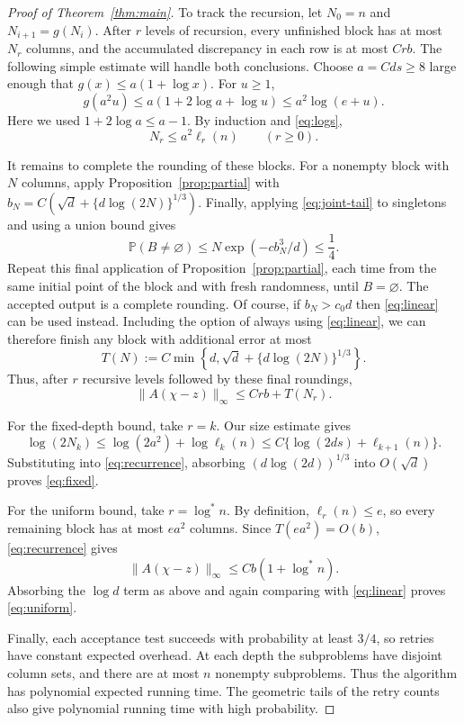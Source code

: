 \documentclass[10pt,a4paper]{amsart}
\newcommand{\Prob}{\mathbb P}
\newcommand{\norm}[1]{\lVert#1\rVert}
\newcommand{\lstar}{\log^*}
\begin{document}
\begin{proof}[Proof of Theorem~\ref{thm:main}]
To track the recursion, let $N_0=n$ and $N_{i+1}=g(N_i)$. After $r$ levels of recursion, every unfinished block has at most $N_r$ columns, and the accumulated discrepancy in each row is at most $Crb$. The following simple estimate will handle both conclusions. Choose $a=Cds\ge8$ large enough that $g(x)\le a(1+\log x)$. For $u\ge1$,
\[ g(a^2u) \le a(1+2\log a+\log u) \le a^2\log(e+u). \]
Here we used $1+2\log a\le a-1$. By induction and \eqref{eq:logs},
\[ N_r\le a^2\ell_r(n)\qquad(r\ge0). \]

It remains to complete the rounding of these blocks. For a nonempty block with $N$ columns, apply Proposition~\ref{prop:partial} with $b_N=C(\sqrt d+\{d\log(2N)\}^{1/3})$. Finally, applying \eqref{eq:joint-tail} to singletons and using a union bound gives
\[ \Prob(B\ne\varnothing) \le N\exp(-cb_N^3/d)\le\frac14. \]
Repeat this final application of Proposition~\ref{prop:partial}, each time from the same initial point of the block and with fresh randomness, until $B=\varnothing$. The accepted output is a complete rounding. Of course, if $b_N>c_0d$ then \eqref{eq:linear} can be used instead. Including the option of always using \eqref{eq:linear}, we can therefore finish any block with additional error at most
\begin{equation}\label{eq:terminal} T(N):=C\min\left\{d,\sqrt d+\{d\log(2N)\}^{1/3}\right\}. \end{equation}
Thus, after $r$ recursive levels followed by these final roundings,
\begin{equation}\label{eq:recurrence} \norm{A(\chi-z)}_\infty \le Crb+T(N_r). \end{equation}

For the fixed-depth bound, take $r=k$. Our size estimate gives
\[ \log(2N_k) \le\log(2a^2)+\log\ell_k(n) \le C\{\log(2ds)+\ell_{k+1}(n)\}. \]
Substituting into \eqref{eq:recurrence}, absorbing $(d\log(2d))^{1/3}$ into $O(\sqrt d)$ proves \eqref{eq:fixed}.

For the uniform bound, take $r=\lstar n$. By definition, $\ell_r(n)\le e$, so every remaining block has at most $ea^2$ columns. Since $T(ea^2)=O(b)$, \eqref{eq:recurrence} gives
\[ \norm{A(\chi-z)}_\infty\le Cb(1+\lstar n). \]
Absorbing the $\log d$ term as above and again comparing with \eqref{eq:linear} proves \eqref{eq:uniform}.

Finally, each acceptance test succeeds with probability at least $3/4$, so retries have constant expected overhead. At each depth the subproblems have disjoint column sets, and there are at most $n$ nonempty subproblems. Thus the algorithm has polynomial expected running time. The geometric tails of the retry counts also give polynomial running time with high probability.
\end{proof}
\end{document}
